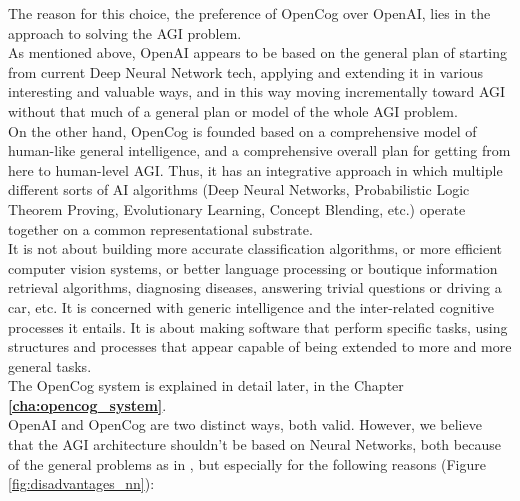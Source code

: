 The reason for this choice, the preference of OpenCog over OpenAI, lies in the approach to solving the AGI problem.\\
As mentioned above, OpenAI appears to be based on the general plan of starting from current Deep Neural Network tech, applying and extending it in various interesting and valuable ways, and in this way moving incrementally toward AGI without that much of a general plan or model of the whole AGI problem.\\
On the other hand, OpenCog is founded based on a comprehensive model of human-like general intelligence, and a comprehensive overall plan for getting from here to human-level AGI. Thus, it has an integrative approach in which multiple different sorts of AI algorithms (Deep Neural Networks, Probabilistic Logic Theorem Proving, Evolutionary Learning, Concept Blending, etc.) operate together on a common representational substrate. \\
It is not about building more accurate classification algorithms, or more efficient computer vision systems, or better language processing or boutique information retrieval algorithms, diagnosing diseases, answering trivial questions or driving a car, etc. It is concerned with generic intelligence and the inter-related cognitive processes it entails. It is about making software that perform specific tasks, using structures and processes that appear capable of being extended to more and more general tasks. \\
The OpenCog system is explained in detail later, in the Chapter \textbf{\ref{cha:opencog_system}}. \\

OpenAI and OpenCog are two distinct ways, both valid. However, we believe that the AGI architecture shouldn't be based on Neural Networks, both because of the general problems as in \cite{323037}, but especially for the following reasons (Figure \ref{fig:disadvantages_nn}):


